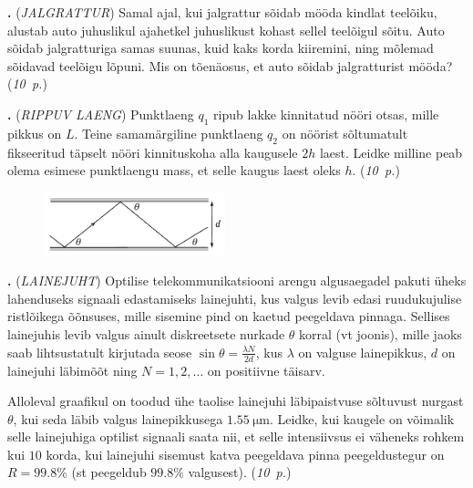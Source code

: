 \documentclass[11pt,a5paper]{article}
\newcommand{\numb}[1]{\vspace{5pt}\textbf{\large #1}}
\newcommand{\nimi}[1]{(\textsl{\small #1})}
\newcommand{\punktid}[1]{(\emph{#1~p.})}
\newcommand{\autor}[1]{}
\newcounter{ylesanne}
\newcommand{\yl}[1]{\addtocounter{ylesanne}{1}\numb{\theylesanne.} \nimi{#1} \newblock{}}
\begin{document}
\yl{JALGRATTUR}
Samal ajal, kui jalgrattur sõidab mööda kindlat teelõiku, alustab auto juhuslikul ajahetkel juhuslikust kohast sellel teelõigul sõitu. Auto sõidab jalgratturiga samas suunas, kuid kaks korda kiiremini, ning mõlemad sõidavad teelõigu lõpuni. Mis on tõenäosus, et auto sõidab jalgratturist mööda?
\punktid{10} \autor{Jarl Patrick Paide}

\yl{RIPPUV LAENG}
Punktlaeng $q_1$ ripub lakke kinnitatud nööri otsas, mille pikkus on $L$. Teine samamärgiline punktlaeng $q_2$ on nöörist sõltumatult fikseeritud täpselt nööri kinnituskoha alla kaugusele $2h$ laest. Leidke milline peab olema esimese punktlaengu mass, et selle kaugus laest oleks $h$.
\punktid{10} \autor{Kaur Aare Saar}

\newpage
\begin{figure}
  \begin{center}
		\vspace{-15pt}
		\includegraphics[width=0.47\textwidth]{lainejuht_yl.pdf}
		\vspace{-35pt}
  \end{center}
\end{figure}
\yl{LAINEJUHT}
Optilise telekommunikatsiooni arengu algusaegadel pakuti üheks lahenduseks signaali edastamiseks lainejuhti, kus valgus levib edasi ruudukujulise ristlõikega õõnsuses, mille sisemine pind on kaetud peegeldava pinnaga. Sellises lainejuhis levib valgus ainult diskreetsete nurkade $\theta$ korral (vt joonis), mille jaoks saab lihtsustatult kirjutada seose $\sin\theta=\tfrac{\lambda N}{2d}$, kus $\lambda$ on valguse lainepikkus, $d$ on lainejuhi läbimõõt ning $N=1,2,\dots$ on positiivne täisarv.

Alloleval graafikul on toodud ühe taolise lainejuhi läbipaistvuse sõltuvust nurgast $\theta$, kui seda läbib valgus lainepikkusega $\SI{1.55}{\micro\m}$. Leidke, kui kaugele on võimalik selle lainejuhiga optilist signaali saata nii, et selle intensiivsus ei väheneks rohkem kui $10$ korda, kui lainejuhi sisemust katva peegeldava pinna peegeldustegur on $R=99.8\%$ (st peegeldub $99.8\%$ valgusest).
\punktid{10} \autor{Hans Daniel Kaimre}

\begin{figure}[H]
	\centering
	
	\vspace{-45pt}
\end{figure}
\end{document}

